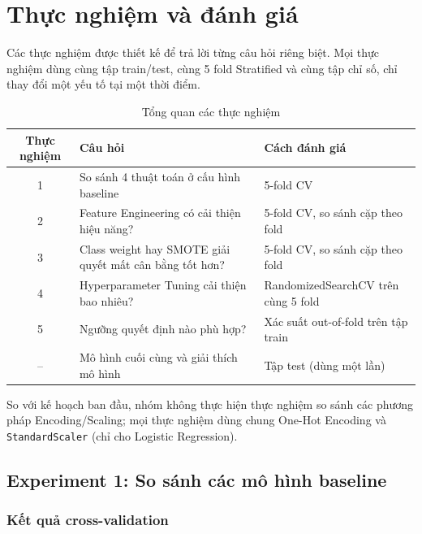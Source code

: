 \section{Thực nghiệm và đánh giá}

Các thực nghiệm được thiết kế để trả lời từng câu hỏi riêng biệt. Mọi thực nghiệm dùng cùng tập train/test, cùng 5 fold Stratified và cùng tập chỉ số, chỉ thay đổi một yếu tố tại một thời điểm.

\begin{table}[H]
\centering
\begin{tabular}{c p{6cm} p{6.5cm}}
\toprule
\textbf{Thực nghiệm} & \textbf{Câu hỏi} & \textbf{Cách đánh giá} \\
\midrule
1 & So sánh 4 thuật toán ở cấu hình baseline & 5-fold CV \\
2 & Feature Engineering có cải thiện hiệu năng? & 5-fold CV, so sánh cặp theo fold \\
3 & Class weight hay SMOTE giải quyết mất cân bằng tốt hơn? & 5-fold CV, so sánh cặp theo fold \\
4 & Hyperparameter Tuning cải thiện bao nhiêu? & RandomizedSearchCV trên cùng 5 fold \\
5 & Ngưỡng quyết định nào phù hợp? & Xác suất out-of-fold trên tập train \\
-- & Mô hình cuối cùng và giải thích mô hình & Tập test (dùng một lần) \\
\bottomrule
\end{tabular}
\caption{Tổng quan các thực nghiệm}
\end{table}

So với kế hoạch ban đầu, nhóm không thực hiện thực nghiệm so sánh các phương pháp Encoding/Scaling; mọi thực nghiệm dùng chung One-Hot Encoding và \texttt{StandardScaler} (chỉ cho Logistic Regression).

\subsection{Experiment 1: So sánh các mô hình baseline}

\subsubsection{Kết quả cross-validation}

